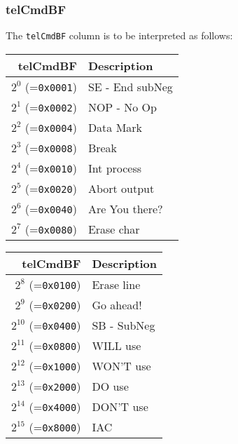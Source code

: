 \documentclass[documentation]{subfiles}
\begin{document}
\subsubsection{telCmdBF}\label{telCmdBF}
The {\tt telCmdBF} column is to be interpreted as follows:\\
\begin{minipage}{0.49\textwidth}
    \begin{longtable}{rl}
        \toprule
        {\bf telCmdBF} & {\bf Description} \\
        \midrule\endhead%
        $2^{0}$  (={\tt 0x0001}) & SE - End subNeg\\
        $2^{1}$  (={\tt 0x0002}) & NOP - No Op\\
        $2^{2}$  (={\tt 0x0004}) & Data Mark\\
        $2^{3}$  (={\tt 0x0008}) & Break\\
        $2^{4}$  (={\tt 0x0010}) & Int process\\
        $2^{5}$  (={\tt 0x0020}) & Abort output\\
        $2^{6}$  (={\tt 0x0040}) & Are You there?\\
        $2^{7}$  (={\tt 0x0080}) & Erase char\\
        \bottomrule
    \end{longtable}
\end{minipage}
\hfill
\begin{minipage}{0.49\textwidth}
    \begin{longtable}{rl}
        \toprule
        {\bf telCmdBF} & {\bf Description} \\
        \midrule\endhead%
        $2^{8}$  (={\tt 0x0100}) & Erase line\\
        $2^{9}$  (={\tt 0x0200}) & Go ahead!\\
        $2^{10}$ (={\tt 0x0400}) & SB - SubNeg\\
        $2^{11}$ (={\tt 0x0800}) & WILL use\\
        $2^{12}$ (={\tt 0x1000}) & WON'T use\\
        $2^{13}$ (={\tt 0x2000}) & DO use\\
        $2^{14}$ (={\tt 0x4000}) & DON'T use\\
        $2^{15}$ (={\tt 0x8000}) & IAC\\
        \bottomrule
    \end{longtable}
\end{minipage}
\end{document}
